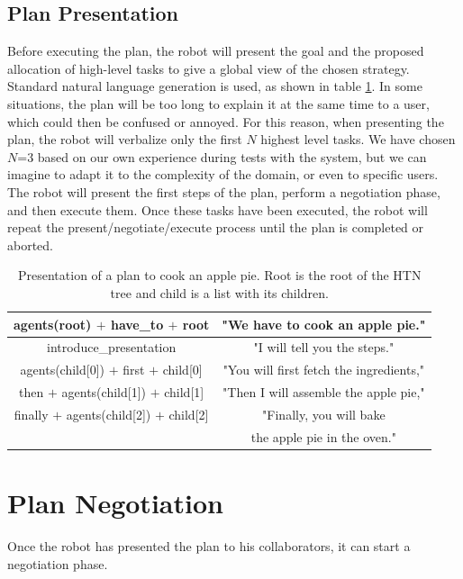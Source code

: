 \subsection{Plan Presentation}
Before executing the plan, the robot will present the goal and the proposed allocation of high-level tasks to give a global view of the chosen strategy. Standard natural language generation is used, as shown in table \ref{table:plan_management-pie-present}. 
In some situations, the plan will be too long to explain it at the same time to a user, which could then be confused or annoyed. For this reason, when presenting the plan, the robot will verbalize only the first $N$  highest level tasks. We have chosen $N$=$3$ based on our own experience during tests with the system, but we can imagine to adapt it to the complexity of the domain, or even to specific users. The robot will present the first steps of the plan, perform a negotiation phase, and then execute them. Once these tasks have been executed, the robot will repeat the present/negotiate/execute process until the plan is completed or aborted.
 
 \begin{table}
\centering
\scriptsize
\renewcommand{\arraystretch}{1.3}
\begin{tabular}{c|c}
   agents(root) $+$ have\_to $+$ root  & "We have to cook an apple pie." \\
   \hline
   introduce\_presentation & "I will tell you the steps." \\
   \hline
   agents(child[0]) $+$ first $+$ child[0] & "You will first fetch the ingredients," \\
   \hline
   then $+$ agents(child[1]) $+$  child[1] & "Then I will assemble the apple pie," \\
   \hline
   finally $+$ agents(child[2]) $+$  child[2] & "Finally, you will bake \\
   & the apple pie in the oven." \\
\end{tabular}
\caption[Presentation of a plan to cook an apple pie]{Presentation of a plan to cook an apple pie. Root is the root of the HTN tree and child is a list with its children.}
 \label{table:plan_management-pie-present}    
\end{table}

\section{Plan Negotiation}
\label{sec:plan_management-negotiation}
Once the robot has presented the plan to his collaborators, it can start a negotiation phase. 


